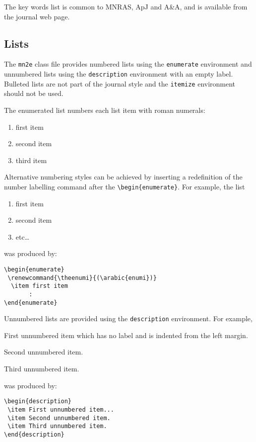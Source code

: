 \documentclass[useAMS,usenatbib]{mn2e}
\begin{document}
The key words list is common to MNRAS, ApJ and A\&A, and is
available from the journal web page.\footnotemark[1]

\subsection{Lists}

The {\tt mn2e} class file provides numbered lists using the
\verb"enumerate" environment and unnumbered lists using the
\verb"description" environment with an empty label. Bulleted lists are not
part of the journal style and the \verb"itemize" environment should not be
used.

The enumerated list numbers each list item with roman numerals:
%
\begin{enumerate}
  \item first item
  \item second item
  \item third item
\end{enumerate}
%
Alternative numbering styles can be achieved by inserting a
redefinition of the number labelling command after the
\verb"\begin{enumerate}". For example, the list
%
\begin{enumerate}
\renewcommand{\theenumi}{(\arabic{enumi})}
  \item first item
  \item second item
  \item etc\ldots
\end{enumerate}
%
was produced by:
%
\begin{verbatim}
\begin{enumerate}
 \renewcommand{\theenumi}{(\arabic{enumi})}
  \item first item
       :
\end{enumerate}
\end{verbatim}
%
Unnumbered lists are provided using the \verb"description" environment.
For example,
\begin{description}
  \item First unnumbered item which has no label and is indented from
        the left margin.
  \item Second unnumbered item.
  \item Third unnumbered item.
\end{description}
was produced by:
%
\begin{verbatim}
\begin{description}
 \item First unnumbered item...
 \item Second unnumbered item.
 \item Third unnumbered item.
\end{description}
\end{verbatim}
\end{document}
